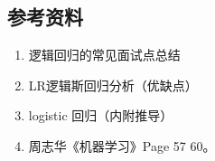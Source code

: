 \documentclass[letterpaper,10pt,english]{sphinxmanual}
\begin{document}
\subsection{参考资料}
\label{\detokenize{machineLearning/01_lr:id5}}\begin{enumerate}
\item {} 
逻辑回归的常见面试点总结

\end{enumerate}
\begin{quote}

\end{quote}
\begin{enumerate}
\setcounter{enumi}{1}
\item {} 
LR逻辑斯回归分析（优缺点）

\end{enumerate}
\begin{quote}

\end{quote}
\begin{enumerate}
\setcounter{enumi}{2}
\item {} 
logistic 回归（内附推导）

\end{enumerate}
\begin{quote}

\end{quote}
\begin{enumerate}
\setcounter{enumi}{3}
\item {} 
周志华《机器学习》Page 57 \textendash{} 60。

\end{enumerate}
\end{document}
